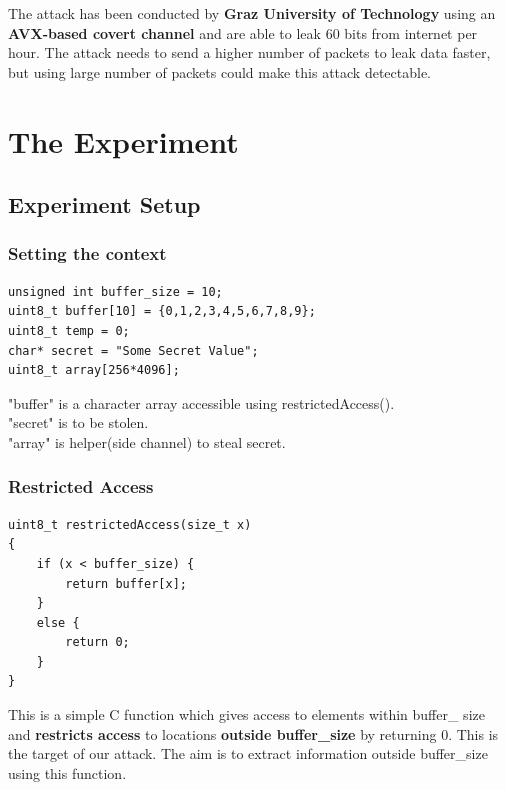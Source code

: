 \documentclass[12pt]{article}
\begin{document}
The attack has been conducted by \textbf{Graz University of Technology}\cite{NETSPECTRE} using an \textbf{AVX-based covert channel} and are able to leak 60 bits from internet per hour. The attack needs to send a higher number of packets to leak data faster, but using large number of packets could make this attack detectable.
\section{The Experiment\cite{SeedLabs}}

\subsection{Experiment Setup}

\subsubsection{Setting the context}
\begin{lstlisting}[style=CStyle]
unsigned int buffer_size = 10;
uint8_t buffer[10] = {0,1,2,3,4,5,6,7,8,9};
uint8_t temp = 0;
char* secret = "Some Secret Value";
uint8_t array[256*4096];
\end{lstlisting}
"buffer" is a character array accessible using restrictedAccess().\\
"secret" is to be stolen.\\
"array" is helper(side channel) to steal secret.  

\subsubsection{Restricted Access}
\begin{lstlisting}[style=CStyle]
uint8_t restrictedAccess(size_t x)
{
	if (x < buffer_size) {
		return buffer[x];
	} 
	else {
		return 0;
	}
}
\end{lstlisting}
This is a simple C function which gives access to elements within buffer\_ size and \textbf{restricts access} to locations \textbf{outside buffer\_size} by returning 0. This is the target of our attack. The aim is to extract information outside buffer\_size using this function. 
\end{document}

